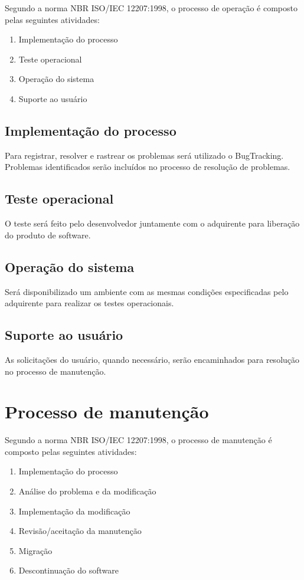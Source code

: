 Segundo a norma NBR ISO/IEC 12207:1998, o processo de operação é composto pelas seguintes atividades:

\begin{enumerate}
  \item Implementação do processo
  \item Teste operacional
  \item Operação do sistema
  \item Suporte ao usuário
\end{enumerate}

\subsection{Implementação do processo}

Para registrar, resolver e rastrear os problemas será utilizado o BugTracking. Problemas identificados serão incluídos no processo de resolução de problemas.%

\subsection{Teste operacional}

O teste será feito pelo desenvolvedor juntamente com o adquirente para liberação do produto de software.

\subsection{Operação do sistema}

Será disponibilizado um ambiente com as mesmas condições especificadas pelo adquirente para realizar os testes operacionais.

\subsection{Suporte ao usuário}

As solicitações do usuário, quando necessário, serão encaminhados para resolução no processo de manutenção.

\section{Processo de manutenção}
\label{sec:manutencao}

Segundo a norma NBR ISO/IEC 12207:1998, o processo de manutenção é composto pelas seguintes atividades:

\begin{enumerate}
  \item Implementação do processo
  \item Análise do problema e da modificação
  \item Implementação da modificação
  \item Revisão/aceitação da manutenção
  \item Migração
  \item Descontinuação do software
\end{enumerate}

